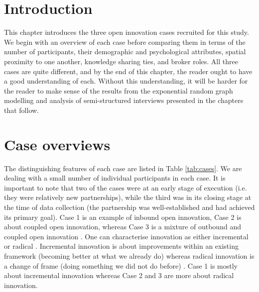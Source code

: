 \section{Introduction}

This chapter introduces the three open innovation cases recruited for this study. We begin with an overview of each case before comparing them in terms of the number of participants, their demographic and psychological attributes, spatial proximity to one another, knowledge sharing ties, and broker roles. All three cases are quite different, and by the end of this chapter, the reader ought to have a good understanding of each. Without this understanding, it will be harder for the reader to make sense of the results from the exponential random graph modelling and analysis of semi-structured interviews presented in the chapters that follow.

\section{Case overviews}

The distinguishing features of each case are listed in Table \ref{tab:cases}. We are dealing with a small number of individual participants in each case. It is important to note that two of the cases were at an early stage of execution (i.e. they were relatively new partnerships), while the third was in its closing stage at the time of data collection (the partnership was well-established and had achieved its primary goal). Case 1 is an example of inbound open innovation, Case 2 is about coupled open innovation, whereas Case 3 is a mixture of outbound and coupled open innovation \citep{gassmann2004towards}. One can characterise innovation as either incremental or radical \citep{ettlie1984organization}. Incremental innovation is about improvements within an existing framework (becoming better at what we already do) whereas radical innovation is a change of frame (doing something we did not do before) \citep{norman2014incremental}. Case 1 is mostly about incremental innovation whereas Case 2 and 3 are more about radical innovation.

